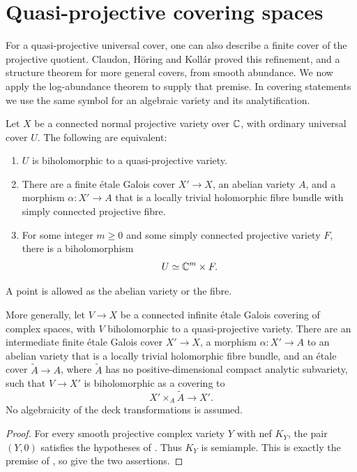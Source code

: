\section{Quasi-projective covering spaces}\label{sec:quasiprojective}

For a quasi-projective universal cover, one can also describe a finite
cover of the projective quotient. Claudon, H\"oring and Koll\'ar proved
this refinement, and a structure theorem for more general covers, from
smooth abundance. We now apply the log-abundance theorem to supply that
premise. In covering statements we use the same symbol for an algebraic
variety and its analytification.

\begin{corollary}\label{cor:quasiprojective}
Let \(X\) be a connected normal projective variety over \(\mathbb C\), with
ordinary universal cover \(U\). The following are equivalent:
\begin{enumerate}[label=\textup{(\roman*)}]
\item \(U\) is biholomorphic to a quasi-projective variety.
\item There are a finite \'etale Galois cover \(X'\to X\), an abelian
variety \(A\), and a morphism \(\alpha:X'\to A\) that is a locally
trivial holomorphic fibre bundle with simply connected projective fibre.
\item For some integer \(m\geq0\) and some simply connected projective
variety \(F\), there is a biholomorphism
\[
                         U\simeq\mathbb C^m\times F.
\]
\end{enumerate}
A point is allowed as the abelian variety or the fibre.

More generally, let \(V\to X\) be a connected infinite \'etale Galois
covering of complex spaces, with \(V\) biholomorphic to a quasi-projective
variety. There are an intermediate finite \'etale Galois cover \(X'\to X\),
a morphism \(\alpha:X'\to A\) to an abelian variety that is a locally
trivial holomorphic fibre bundle, and an \'etale cover
\(\widetilde A\to A\), where \(\widetilde A\) has no positive-dimensional
compact analytic subvariety, such that \(V\to X'\) is biholomorphic as a
covering to
\[
                    X'\times_A\widetilde A\longrightarrow X'.
\]
No algebraicity of the deck transformations is assumed.
\end{corollary}

\begin{proof}
For every smooth projective complex variety \(Y\) with nef \(K_Y\), the
pair \((Y,0)\) satisfies the hypotheses of
\cite[Theorem~1.1]{OpenAILogAbundance2026}. Thus \(K_Y\) is semiample.
This is exactly the premise of
\cite[Conjecture~1.2]{ClaudonHoeringKollar2013}, so
\cite[Theorem~1.1 and Corollary~1.5]{ClaudonHoeringKollar2013} give the
two assertions.
\end{proof}

